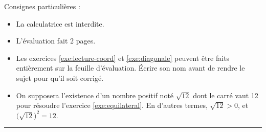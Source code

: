 

\SetDate[15/10/2025]
\reversemarginpar
\setlength{\marginparsep}{.5cm}

\newcommand{\exeI}{1}
\newcommand{\exeII}{2}
\newcommand{\exeIII}{3}
\newcommand{\exeIV}{4}
\newcommand{\exeV}{5}
\newcommand{\exeVI}{6}
\newcommand{\exeVII}{7}
\newcommand{\exeVIII}{8}
\newcommand{\exeIX}{9}
\newcommand{\exeX}{10}
\newcommand{\exeXI}{11}


\pagestyle{fancy}
\fancyhead[R]{\today}

\null\vspace{-30pt}
Consignes particulières : 
\begin{itemize}[label=$\bullet$]
	\item 
	La calculatrice est {interdite}.
	\item
	L'évaluation fait 2 pages.
	\item
	Les exercices \ref{exe:lecture-coord} et \ref{exe:diagonale} peuvent être faits entièrement sur la feuille d'évaluation. Écrire son nom avant de rendre le sujet pour qu'il soit corrigé.
	\item 
	On supposera l'existence d'un nombre positif noté $\sqrt{12}$ dont le carré vaut 12 pour résoudre l'exercice \ref{exe:equilateral}.
	En d'autres termes, $\sqrt{12} > 0$, et $\bigl(\sqrt{12}\bigr)^2 = 12$.
\end{itemize}

\marginpar{[pts]}
\hrule
























\newpage
{}
\shipoutAnswer


